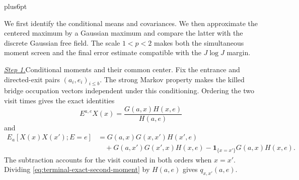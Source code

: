 \documentclass[12pt,reqno]{amsart}
\makeatletter
\theoremstyle{plain}
\theoremstyle{definition}
\theoremstyle{remark}
\renewenvironment{proof}[1][\proofname]{%
  \par
  \pushQED{\qed}%
  \normalfont
  \topsep6pt plus6pt\relax
  \trivlist
  \item[\hskip\labelsep\slshape #1\@addpunct{.}]%
  \ignorespaces
}{%
  \popQED
  \endtrivlist
  \@endpefalse
}
\DeclareRobustCommand{\qed}{%
  \leavevmode\unskip\penalty9999\hbox{}\nobreak
  \ifmmode
    \makebox[0pt][l]{\qquad\hbox{\qedsymbol}}%
  \else
    \qquad\hbox{\qedsymbol}%
  \fi
}
\renewcommand{\qedsymbol}{\rule[.47pt]{4pt}{6pt}}
\numberwithin{equation}{section}
\makeatother
\begin{document}
\begin{proof}
We first identify the conditional means and covariances.  We then
approximate the centered maximum by a Gaussian maximum and compare
the latter with the discrete Gaussian free field.  The scale
$1<p<2$ makes both the simultaneous moment screen and the final
error estimate compatible with the $J\log J$ margin.

\smallskip\noindent
\underline{\textit{Step 1.}}\quad Conditional moments and their common center.
Fix the entrance and directed-exit pairs $(a_i,e_i)_{i\le b}$.
The strong Markov property makes the killed bridge occupation vectors
independent under this conditioning.  Ordering the two visit times
gives the exact identities
\begin{equation}
 E^{a,e}X(x)=\frac{G(a,x)H(x,e)}{H(a,e)}
 \label{eq:terminal-exact-mean}
\end{equation}
and
\begin{equation}
 \begin{split}
 E_a[X(x)X(x');E=e]
 &=G(a,x)G(x,x')H(x',e)\\
 &\quad+G(a,x')G(x',x)H(x,e)
 -\mathbf1_{\{x=x'\}}G(a,x)H(x,e).
 \end{split}
 \label{eq:terminal-exact-second-moment}
\end{equation}
The subtraction accounts for the visit counted in both orders when
$x=x'$.  Dividing \eqref{eq:terminal-exact-second-moment} by $H(a,e)$
gives $q_{x,x'}(a,e)$.


\end{proof}
\end{document}
